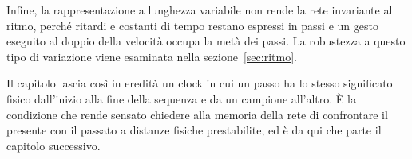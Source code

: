 Infine, la rappresentazione a lunghezza variabile non rende la rete invariante al ritmo, perché ritardi e costanti di tempo restano espressi in passi e un gesto eseguito al doppio della velocità occupa la metà dei passi. La robustezza a questo tipo di variazione viene esaminata nella sezione~\ref{sec:ritmo}.

Il capitolo lascia così in eredità un clock in cui un passo ha lo stesso significato fisico dall'inizio alla fine della sequenza e da un campione all'altro. È la condizione che rende sensato chiedere alla memoria della rete di confrontare il presente con il passato a distanze fisiche prestabilite, ed è da qui che parte il capitolo successivo.
